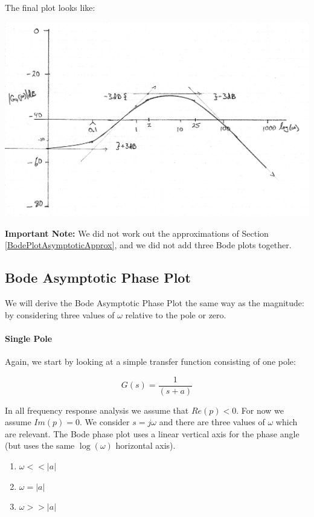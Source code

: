 \begin{ExampleCont}
The final plot looks like:

\includegraphics[width=6.5in]{figs05/00739a.png}


{\bf Important Note: }  We did not work out the approximations of Section \ref{BodePlotAsymptoticApprox},
and we did not add three Bode plots together.


\end{ExampleCont}




\subsection{Bode Asymptotic Phase Plot}

We will derive the Bode Asymptotic Phase Plot the same way as the magnitude: by considering three values of $\omega$ relative to the pole or zero.

\paragraph{Single Pole}

Again, we start by looking at a simple transfer function consisting of one pole:

\[
G(s) = \frac{1}{(s+a)}
\]

In all frequency response analysis we assume that $Re(p) < 0$.  For now we assume $Im(p) = 0$.
We consider $s=j\omega$ and there are three values of $\omega$ which are relevant.
The Bode phase  plot uses a linear vertical axis for the phase angle (but uses the same $\log(\omega)$ horizontal axis).

\begin{enumerate}
  \item  $\omega << |a|$
  \item  $\omega = |a|$
  \item  $\omega >> |a|$
\end{enumerate}

